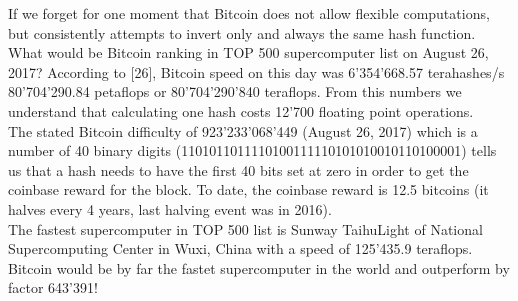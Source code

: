 If we forget for one moment that Bitcoin does not allow flexible computations, but consistently attempts to invert only and always the same hash function. What would be Bitcoin ranking in TOP 500 supercomputer list on August 26, 2017? According to [26], Bitcoin speed on this day was 6'354'668.57 terahashes/s 80'704'290.84 petaflops or 80'704'290'840 teraflops. From this numbers we understand that calculating one hash costs 12'700 floating point operations. \\

The stated Bitcoin difficulty of 923'233'068'449 (August 26, 2017) which is a number of 40 binary digits (1101011011110100111110101010010110100001) tells us that a hash needs to have the first 40 bits set at zero in order to get the coinbase reward for the block. To date, the coinbase reward is 12.5 bitcoins (it halves every 4 years, last halving event was in 2016).\\

The fastest supercomputer in TOP 500 list is Sunway TaihuLight of National Supercomputing Center in Wuxi, China with a speed of 125'435.9 teraflops. Bitcoin would be by far the fastet supercomputer in the world and outperform by factor 643'391!
